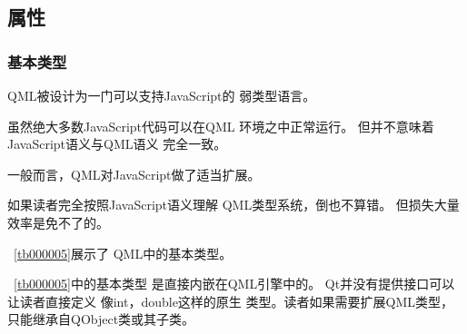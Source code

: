 ﻿




\FloatBarrier
\subsection{
属性
}\label{c000011s000000s01}



\FloatBarrier
\subsubsection{
基本类型
}\label{c000011s000000s01s01}


QML被设计为一门可以支持JavaScript的
弱类型语言。

虽然绝大多数JavaScript代码可以在QML
环境之中正常运行。
但并不意味着JavaScript语义与QML语义
完全一致。

一般而言，QML对JavaScript做了适当扩展。

如果读者完全按照JavaScript语义理解
QML类型系统，倒也不算错。
但损失大量效率是免不了的。

\tablename\ \ref{tb000005}展示了
QML中的基本类型。



\tablename\ \ref{tb000005}中的基本类型
是直接内嵌在QML引擎中的。
Qt并没有提供接口可以让读者直接定义
像int，double这样的原生
类型。读者如果需要扩展QML类型，只能继承自QObject类或其子类。




